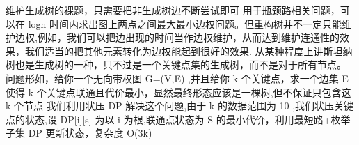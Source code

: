 {}\markdownRendererDollarSign{}维护生成树的裸题，只需要把非生成树边不断尝试即可\markdownRendererInterblockSeparator
{}
\markdownRendererSectionEnd 
\markdownRendererSectionEnd \markdownRendererSectionBegin
{}\markdownRendererInterblockSeparator
{}用于瓶颈路相关问题，可以在\markdownRendererDollarSign{} logn \markdownRendererDollarSign{}时间内求出图上两点之间最大最小边权问题。但重构树并不一定只能维护边权,例如，我们可以把边出现的时间当作边权维护，从而达到维护连通性的效果，我们适当的把其他元素转化为边权能起到很好的效果.\markdownRendererInterblockSeparator
{}\markdownRendererInterblockSeparator
{}
\markdownRendererSectionEnd \markdownRendererSectionBegin
{}\markdownRendererInterblockSeparator
{}从某种程度上讲斯坦纳树也是生成树的一种，只不过是一个关键点集的生成树，而不是对于所有节点。\markdownRendererParagraphSeparator
{}问题形如，给你一个无向带权图\markdownRendererDollarSign{} G=(V,E) \markdownRendererDollarSign{},并且给你\markdownRendererDollarSign{} k\markdownRendererSoftLineBreak
{}\markdownRendererDollarSign{}个关键点，求一个边集\markdownRendererDollarSign{} E \markdownRendererDollarSign{}使得\markdownRendererDollarSign{} k \markdownRendererDollarSign{}个关键点联通且代价最小，显然最终形态应该是一棵树,但不保证只包含这\markdownRendererDollarSign{} k \markdownRendererDollarSign{}个节点\markdownRendererParagraphSeparator
{}我们利用状压\markdownRendererDollarSign{} DP \markdownRendererDollarSign{}解决这个问题,由于\markdownRendererDollarSign{} k\markdownRendererSoftLineBreak
{}\markdownRendererDollarSign{}的数据范围为\markdownRendererDollarSign{} 10 \markdownRendererDollarSign{},我们状压关键点的状态,设\markdownRendererDollarSign{} DP[i][s] \markdownRendererDollarSign{}为以\markdownRendererDollarSign{} i\markdownRendererParagraphSeparator
{} \markdownRendererDollarSign{}为根,联通点状态为\markdownRendererDollarSign{} S\markdownRendererSoftLineBreak
{}\markdownRendererDollarSign{}的最小代价，利用最短路+枚举子集\markdownRendererDollarSign{} DP \markdownRendererDollarSign{}更新状态，复杂度\markdownRendererDollarSign{} O(3\markdownRendererCircumflex{}k) \markdownRendererDollarSign{}\markdownRendererInterblockSeparator
{}\markdownRendererInterblockSeparator
